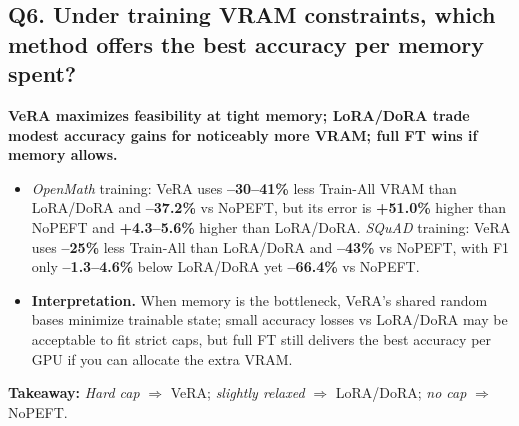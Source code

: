 \documentclass[11pt,a4paper]{article}
\begin{document}
\subsection*{Q6. Under training VRAM constraints, which method offers the best accuracy per memory spent?}
\textbf{VeRA maximizes feasibility at tight memory; LoRA/DoRA trade modest accuracy gains for noticeably more VRAM; full FT wins if memory allows.}
\begin{itemize}
  \item \textit{OpenMath} training: VeRA uses \textbf{--30--41\%} less Train-All VRAM than LoRA/DoRA and \textbf{--37.2\%} vs NoPEFT, but its error is \textbf{+51.0\%} higher than NoPEFT and \textbf{+4.3--5.6\%} higher than LoRA/DoRA. \textit{SQuAD} training: VeRA uses \textbf{--25\%} less Train-All than LoRA/DoRA and \textbf{--43\%} vs NoPEFT, with F1 only \textbf{--1.3--4.6\%} below LoRA/DoRA yet \textbf{--66.4\%} vs NoPEFT.
  \item \textbf{Interpretation.} When memory is the bottleneck, VeRA’s shared random bases minimize trainable state; small accuracy losses vs LoRA/DoRA may be acceptable to fit strict caps, but full FT still delivers the best accuracy per GPU if you can allocate the extra VRAM.
\end{itemize}
\textbf{Takeaway:} \emph{Hard cap} $\Rightarrow$ VeRA; \emph{slightly relaxed} $\Rightarrow$ LoRA/DoRA; \emph{no cap} $\Rightarrow$ NoPEFT.
\end{document}

